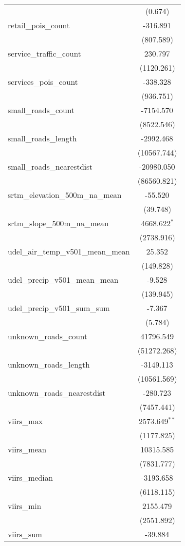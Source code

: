 \begin{table}[!htbp]
\begin{tabular}{@{\extracolsep{5pt}}lc}
  & (0.674) \\
 retail_pois_count & -316.891$^{}$ \\
  & (807.589) \\
 service_traffic_count & 230.797$^{}$ \\
  & (1120.261) \\
 services_pois_count & -338.328$^{}$ \\
  & (936.751) \\
 small_roads_count & -7154.570$^{}$ \\
  & (8522.546) \\
 small_roads_length & -2992.468$^{}$ \\
  & (10567.744) \\
 small_roads_nearestdist & -20980.050$^{}$ \\
  & (86560.821) \\
 srtm_elevation_500m_na_mean & -55.520$^{}$ \\
  & (39.748) \\
 srtm_slope_500m_na_mean & 4668.622$^{*}$ \\
  & (2738.916) \\
 udel_air_temp_v501_mean_mean & 25.352$^{}$ \\
  & (149.828) \\
 udel_precip_v501_mean_mean & -9.528$^{}$ \\
  & (139.945) \\
 udel_precip_v501_sum_sum & -7.367$^{}$ \\
  & (5.784) \\
 unknown_roads_count & 41796.549$^{}$ \\
  & (51272.268) \\
 unknown_roads_length & -3149.113$^{}$ \\
  & (10561.569) \\
 unknown_roads_nearestdist & -280.723$^{}$ \\
  & (7457.441) \\
 viirs_max & 2573.649$^{**}$ \\
  & (1177.825) \\
 viirs_mean & 10315.585$^{}$ \\
  & (7831.777) \\
 viirs_median & -3193.658$^{}$ \\
  & (6118.115) \\
 viirs_min & 2155.479$^{}$ \\
  & (2551.892) \\
 viirs_sum & -39.884$^{}$ \\

\end{tabular}
\end{table}
